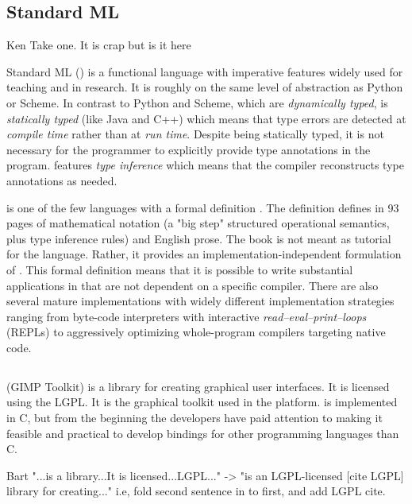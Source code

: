 \documentclass[workingdraft]{usetex-v1}
\begin{document}
\subsection{Standard ML}

\begin{ednote}{Ken}
  Take one.  It is crap but is it here
\end{ednote}

Standard ML (\sml) is a functional language with imperative features
widely used for teaching and in research.  It is roughly on the same
level of abstraction as Python or Scheme. In contrast to Python and
Scheme, which are \emph{dynamically typed}, \sml is \emph{statically
  typed} (like Java and C++) which means that type errors are detected
at \emph{compile time} rather than at \emph{run time}.  Despite \sml
being statically typed, it is not necessary for the programmer to
explicitly provide type annotations in the program. \sml features
\emph{type inference} which means that the compiler reconstructs type
annotations as needed.

\sml is one of the few languages with a formal definition
\cite{Milner:1997:Definition}.  The definition defines \sml in 93
pages of mathematical notation (a "big step" structured operational
semantics, plus type inference rules) and English prose.  The book is
not meant as tutorial for the language. Rather, it provides an
implementation-independent formulation of \sml.  This formal
definition means that it is possible to write substantial applications
in \sml that are not dependent on a specific compiler.  There are also
several mature \sml implementations with widely different
implementation strategies ranging from byte-code interpreters with
interactive \emph{read--eval--print--loops} (REPLs) to aggressively
optimizing whole-program compilers targeting native code.




\subsection{\gtk}
\label{sec:gtk}

\gtk (GIMP Toolkit) is a library for creating graphical user
interfaces. It is licensed using the LGPL. It is the graphical toolkit
used in the \gnome platform.  \gtk is implemented in C, but from the
beginning the \gtk developers have paid attention to making it feasible
and practical to develop bindings for other programming languages than C.

\begin{ednote}{Bart}
  "...is a library...It is licensed...LGPL..." -> "is an
  LGPL-licensed [cite LGPL] library for creating..."  i.e, fold
  second sentence in to first, and add LGPL cite.
\end{ednote}
\end{document}
